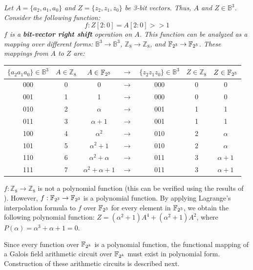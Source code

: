 \begin{Example} {\it
Let $A = \{a_2, a_1, a_0\}$ and $Z = \{z_2,z_1,z_0\}$ be 3-bit vectors.
Thus, $A$ and $Z \in \mathbb{B}^3$. 
Consider the following function:
\begin{equation}
f:Z[2:0] = A[2:0]>>1 \nonumber
\end{equation}
$f$ is a {\bf bit-vector right shift} operation on $A$. 
This function can be analyzed as a mapping over different forms: 
$\mathbb{B}^3 \rightarrow \mathbb{B}^3$,
$\mathbb{Z}_8 \rightarrow \mathbb{Z}_8$, and
${\mathbb{F}}_{2^3} \rightarrow {\mathbb{F}}_{2^3}$. These mappings from $A$ to $Z$ 
are:

\begin{center}
{\small
\begin{tabular}{c|c|ccc|c|c|} 
$\{a_2a_1a_0\}\in\mathbb{B}^3$  & $A\in \mathbb{Z}_8$ & $A\in {\mathbb{F}}_{2^3}$ &$\rightarrow$& $\{z_2z_1z_0\}\in\mathbb{B}^3$ &$Z\in \mathbb{Z}_8$ & $Z\in {\mathbb{F}}_{2^3}$ \\
\hline
000  &0&0 &$\rightarrow$&000 &0& 0 \\
001  &1&1 &$\rightarrow$&000 &0& 0 \\
010  &2&$\alpha$ & $\rightarrow$ & 001&1& 1 \\
011  &3&$\alpha + 1$ &$\rightarrow$& 001&1 &1 \\
100  &4&$\alpha^2$ &$\rightarrow$& 010 &2&  $\alpha$ \\
101  &5&$\alpha^2 + 1$ &$\rightarrow$&010 &2& $\alpha$ \\
110  &6&$\alpha^2 + \alpha$&$\rightarrow$& 011 &3&$\alpha + 1$ \\
111  &7&$\alpha^2 + \alpha + 1$ &$\rightarrow$& 011 &3&$\alpha + 1$\\
\hline
\end {tabular}
}
\end{center}

$f: \mathbb{Z}_8 \rightarrow \mathbb{Z}_8$ is not a polynomial function 
(this can be verified using the results of \cite{singmaster}
\cite{chen_95} \cite{chen_96}). However, $f: {\mathbb{F}}_{2^3} \rightarrow {\mathbb{F}}_{2^3}$
is a polynomial function.
By applying Lagrange's interpolation formula to $f$ over ${\mathbb{F}}_{2^3}$ for 
every element in ${\mathbb{F}}_{2^3}$, 
we obtain the following polynomial function: $Z =
(\alpha^2+1)A^4+(\alpha^2+1)A^2$, where $P(\alpha) = \alpha^3 +
\alpha + 1 = 0$. 
}
\end{Example}

Since every function over ${\mathbb{F}}_{2^k}$ is a polynomial function, the 
functional mapping of a Galois field arithmetic circuit over
${\mathbb{F}}_{2^k}$ must exist in polynomial form. 
Construction of these arithmetic circuits is described next.


